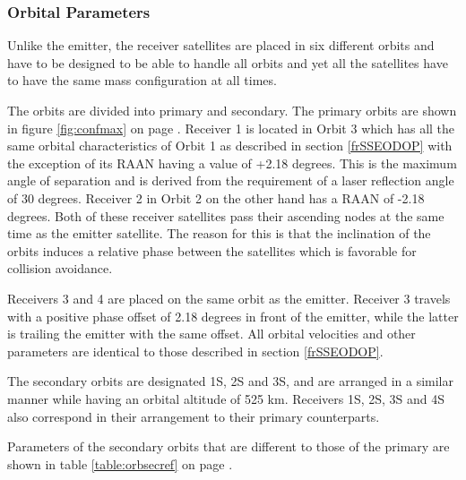 \subsubsection{Orbital Parameters}
\label{frSSRODOP}

Unlike the emitter, the receiver satellites are placed in six different orbits and have to be designed to be able to handle all orbits and yet all the satellites have to have the same mass configuration at all times.

The orbits are divided into primary and secondary. The primary orbits are shown in figure \ref{fig:confmax} on page \pageref{fig:confmax}. Receiver 1 is located in Orbit 3 which has all the same orbital characteristics of Orbit 1 as described in section \ref{frSSEODOP} with the exception of its \acs{RAAN} having a value of +2.18 degrees. This is the maximum angle of separation and is derived from the requirement of a laser reflection angle of 30 degrees. Receiver 2 in Orbit 2 on the other hand has a \acs{RAAN} of -2.18 degrees. Both of these receiver satellites pass their ascending nodes at the same time as the emitter satellite. The reason for this is that the inclination of the orbits induces a relative phase between the satellites which is favorable for collision avoidance.

Receivers 3 and 4 are placed on the same orbit as the emitter. Receiver 3 travels with a positive phase offset of 2.18 degrees in front of the emitter, while the latter is trailing the emitter with the same offset. All orbital velocities and other parameters are identical to those described in section \ref{frSSEODOP}.

The secondary orbits are designated 1S, 2S and 3S, and are arranged in a similar manner while having an orbital altitude of 525 km. Receivers 1S, 2S, 3S and 4S also correspond in their arrangement to their primary counterparts.

Parameters of the secondary orbits that are different to those of the primary are shown in table \ref{table:orbsecref} on page \pageref{table:orbsecref}.

